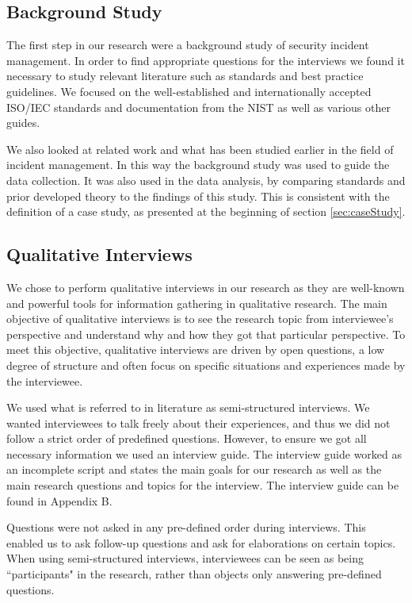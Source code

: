\subsection{Background Study}
\label{sec:background}
The first step in our research were a background study of security incident management. In order to find appropriate questions for the interviews we found it necessary to study relevant literature such as standards and best practice guidelines. We focused on the well-established and internationally accepted ISO/IEC standards and documentation from the \ac{NIST} as well as various other guides.

We also looked at related work and what has been studied earlier in the field of incident management. In this way the background study was used to guide the data collection. It was also used in the data analysis, by comparing standards and prior developed theory to the findings of this study. This is consistent with the definition of a case study, as presented at the beginning of section \ref{sec:caseStudy}.

\subsection{Qualitative Interviews}
\label{sec:interviews}
We chose to perform qualitative interviews in our research as they are well-known and powerful tools for information gathering in qualitative research\cite{myers2007qualitative}. The main objective of qualitative interviews is to see the research topic from interviewee's perspective and understand why and how they got that particular perspective\cite{cassell2004essential}. To meet this objective, qualitative interviews are driven by open questions, a low degree of structure and often focus on specific situations and experiences made by the interviewee. 

We used what is referred to in literature as semi-structured interviews\cite{cassell2004essential}. We wanted interviewees to talk freely about their experiences, and thus we did not follow a strict order of predefined questions. However, to ensure we got all necessary information we used an interview guide. The interview guide worked as an incomplete script and states the main goals for our research as well as the main research questions and topics for the interview. The interview guide can be found in Appendix B.

Questions were not asked in any pre-defined order during interviews. This enabled us to ask follow-up questions and ask for elaborations on certain topics. When using semi-structured interviews, interviewees can be seen as being ``participants" in the research, rather than objects only answering pre-defined questions.

